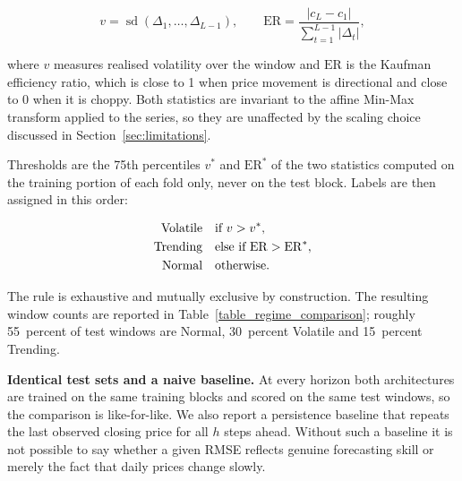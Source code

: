 \begin{equation}
v = \operatorname{sd}(\Delta_1, \dots, \Delta_{L-1}),
\qquad
\mathrm{ER} = \frac{\lvert c_L - c_1 \rvert}{\sum_{t=1}^{L-1} \lvert \Delta_t \rvert},
\label{eq:regime_stats}
\end{equation}

where $v$ measures realised volatility over the window and $\mathrm{ER}$ is the
Kaufman efficiency ratio, which is close to 1 when price movement is
directional and close to 0 when it is choppy. Both statistics are invariant to
the affine Min-Max transform applied to the series, so they are unaffected by
the scaling choice discussed in Section~\ref{sec:limitations}.

Thresholds are the 75th percentiles $v^{\ast}$ and $\mathrm{ER}^{\ast}$ of the
two statistics computed on the training portion of each fold only, never on the
test block. Labels are then assigned in this order:

\begin{align}
\text{Volatile} \quad &\text{if } v > v^{\ast},\notag\\
\text{Trending} \quad &\text{else if } \mathrm{ER} > \mathrm{ER}^{\ast},
\label{eq:regime_rule}\\
\text{Normal}   \quad &\text{otherwise.}\notag
\end{align}

The rule is exhaustive and mutually exclusive by construction. The resulting
window counts are reported in Table~\ref{table_regime_comparison}; roughly
55~percent of test windows are Normal, 30~percent Volatile and 15~percent
Trending.

\noindent\textbf{Identical test sets and a naive baseline.}
At every horizon both architectures are trained on the same training blocks and
scored on the same test windows, so the comparison is like-for-like. We also
report a persistence baseline that repeats the last observed closing price for
all $h$ steps ahead. Without such a baseline it is not possible to say whether a
given RMSE reflects genuine forecasting skill or merely the fact that daily
prices change slowly.





